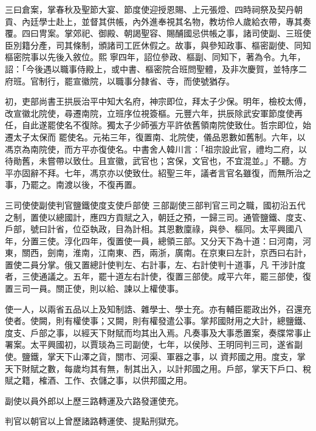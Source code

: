 \begin{pinyinscope}
 三曰倉案，掌春秋及聖節大宴、節度使迎授恩賜、上元張燈、四時祠祭及契丹朝貢、內廷學士赴上，並督其供帳，內外進奉視其名物，教坊伶人歲給衣帶，專其奏覆。四曰冑案。掌郊祀、御殿、朝謁聖容、賜酺國忌供帳之事，諸司使副、三班使臣別籍分產，司其條制，頒諸司工匠休假之。故事，與參知政事、樞密副使、同知樞密院事以先後入敘位。熙
 寧四年，詔位參政、樞副、同知下，著為令。九年，詔：「今後遇以職事侍殿上，或中書、樞密院合班問聖體，及非次慶賀，並特序二府班。官制行，罷宣徽院，以職事分隸省、寺，而使號猶存。



 初，吏部尚書王拱辰治平中知大名府，神宗即位，拜太子少保。明年，檢校太傅，改宣徽北院使，尋遷南院，立班序位視簽樞。元豐六年，拱辰除武安軍節度使再任，自此遂罷使名不復除。獨太子少師張方平許依舊領南院使致仕。哲宗即位，始遷太子太保而
 罷使名。元祐三年，復置南、北院使，儀品恩數如舊制。六年，以馮京為南院使，而方平亦復使名。中書舍人韓川言：「祖宗設此官，禮均二府，以待勛舊，未嘗帶以致仕。且宣徽，武官也；宮保，文官也，不宜混並。」不聽。方平亦固辭不拜。七年，馮京亦以使致仕。紹聖三年，議者言官名雖復，而無所治之事，乃罷之。南渡以後，不復再置。



 三司使使副使判官鹽鐵使度支使戶部使
 三部副使三部判官三司之職，國初沿五代之制，置使以總國計，應四方貢賦之入，朝廷之預，一歸三司。通管鹽鐵、度支、戶部，號曰計省，位亞執政，目為計相。其恩數廩祿，與參、樞同。太平興國八年，分置三使。淳化四年，復置使一員，總領三部。又分天下為十道：曰河南，河東，關西，劍南，淮南，江南東、西，兩浙，廣南。在京東曰左計，京西曰右計，置使二員分掌。俄又置總計使判左、右計事，左、右計使判十道事，凡
 干涉計度者，三使通議之。五年，罷十道左右計使，復置三部使。咸平六年，罷三部使，復置三司一員。關正使，則以給、諫以上權使事。



 使一人，以兩省五品以上及知制誥、雜學士、學士充。亦有輔臣罷政出外，召還充使者。使闕，則有權使事；又闕，則有權發遣公事。掌邦國財用之大計，總鹽鐵、度支、戶部之事，以經天下財賦而均其出入焉。凡奏事及大事悉置案，奏牒常事止署案。太平興國初，以賈琰為三司副使，七年，以侯陟、王明同判三司，遂省副使。鹽鐵，掌天下山澤之貨，關市、河渠、軍器之事，以
 資邦國之用。度支，掌天下財賦之數，每歲均其有無，制其出入，以計邦國之用。戶部，掌天下戶口、稅賦之籍，榷酒、工作、衣儲之事，以供邦國之用。



 副使以員外郎以上歷三路轉運及六路發運使充。



 判官以朝官以上曾歷諸路轉運使、提點刑獄充。




\end{pinyinscope}
